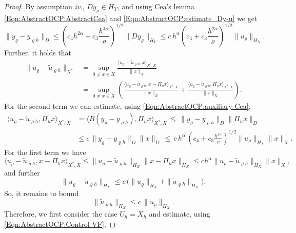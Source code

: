 \documentclass{article}
\newcommand{\norm}[1]{\|#1\|}
\newcommand{\skpr}[1]{\langle#1\rangle}
\numberwithin{equation}{section}
\begin{document}
\begin{proof}
  By assumption {\em iv.}, $Dy_\varrho \in H_Y$, and using Cea's lemma
  \eqref{Eqn:AbstractOCP:AbstractCea} and
  \eqref{Eqn:AbstractOCP:estimate_Dy-u} we get 
  \begin{equation}\label{Eqn:AbstractOCP:auxiliary Cea}
    \norm{y_\varrho - y_{\varrho h}}_D \leq
    \left(c_4h^{2\alpha} + c_3 \frac{h^{4\alpha}}{\varrho}\right)^{1/2}
    \norm{Dy_\varrho}_{H_Y} \leq
    c \, h^\alpha \left(c_4+c_3\frac{h^{2\alpha}}{\varrho}\right)^{1/2}
    \norm{u_\varrho}_{H_X}. 
  \end{equation}
  Further, it holds that 
  \begin{align*}
    \norm{u_\varrho -\widetilde{u}_{\varrho h}}_{X^\ast}
    & = \sup_{0\neq x\in X}
      \frac{\skpr{u_\varrho-\widetilde{u}_{\varrho h},x}_{X^\ast,X}}{\norm{x}_X}\\
    &= \sup_{0\neq x\in X}\left(
      \frac{\skpr{u_\varrho-\widetilde{u}_{\varrho h},x-\Pi_h x}_{X^\ast,X}}
      {\norm{x}_X} +
      \frac{\skpr{u_\varrho-\widetilde{u}_{\varrho h},\Pi_h x}_{X^\ast,X}}
      {\norm{x}_X}\right).
  \end{align*}
  For the second term we can estimate,
  using \eqref{Eqn:AbstractOCP:auxiliary Cea},
  \begin{align*}
    \skpr{u_\varrho - \widetilde{u}_{\varrho h},\Pi_h x}_{X^\ast, X}
    & = \skpr{B(y_\varrho - y_{\varrho h}),\Pi_h x}_{X^\ast,X} \, \leq \,
      \norm{y_\varrho - y_{\varrho h}}_{D}\norm{\Pi_h x}_D\\
    & \leq c \, \norm{y_\varrho - y_{\varrho h}}_D\norm{x}_D
    \, \leq \, c \, h^\alpha \,
    \left(c_4+c_3\frac{h^{2\alpha}}{\varrho}\right)^{1/2}
    \norm{u_\varrho}_{H_X}\norm{x}_X . 
  \end{align*}
  For the first term we have 
  \[
    \skpr{u_\varrho -\widetilde{u}_{\varrho h},x-\Pi_hx}_{X^\ast,X}
    \leq \norm{u_\varrho - \widetilde{u}_{\varrho h}}_{H_X}\norm{x-\Pi_h x}_{H_X}
    \leq ch^\alpha\norm{u_\varrho -\widetilde{u}_{\varrho h}}_{H_X}\norm{x}_{X},
  \]
  and further 
  \[
    \norm{u_\varrho -\widetilde{u}_{\varrho h}}_{H_X}
    \leq
    c \, \Big(
    \norm{u_\varrho}_{H_X}+ \norm{\widetilde{u}_{\varrho h}}_{H_X}\Big). 
  \]
  So, it remains to bound
  \begin{equation*}
    \norm{\widetilde{u}_{\varrho h}}_{H_X} \leq c \, \norm{u_\varrho}_{H_X}.
  \end{equation*}
  Therefore, we first consider the case $U_h = X_h$ and estimate,
  using \eqref{Eqn:AbstractOCP:Control VF},

\end{proof}
\end{document}
